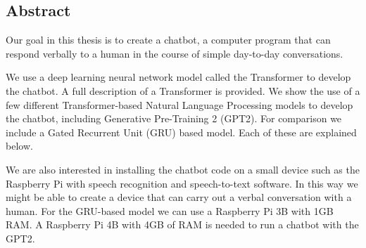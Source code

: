 
\begin{center}
	
\section*{Abstract}
\end{center}



Our goal in this thesis is to create a chatbot, a computer program that can respond verbally to a human in the course of simple day-to-day conversations.

We use a deep learning neural network model called the Transformer to develop the chatbot. A full description of a Transformer is provided. We show  the use of a few different Transformer-based Natural Language Processing models to develop the chatbot, including  Generative Pre-Training 2 (GPT2). For comparison we include a Gated Recurrent Unit (GRU) based model. Each of these are explained below.

We are also interested in installing the chatbot code on a small device  such as the Raspberry Pi with speech recognition and speech-to-text software. In this way we might be able to create a device that can carry out a verbal conversation with a human. For the GRU-based model we can use a Raspberry Pi 3B with 1GB RAM. A Raspberry Pi 4B with 4GB of RAM is needed to run a chatbot with the GPT2. 


